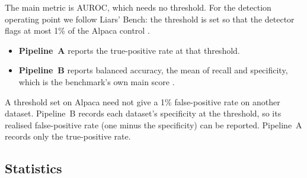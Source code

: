 The main metric is AUROC, which needs no threshold. For the detection operating point we follow Liars' Bench: the threshold is set so that the detector flags at most 1\% of the Alpaca control \parencite[p.~7]{kretschmar2025liars}.
\begin{itemize}
\item \textbf{Pipeline~A} reports the true-positive rate at that threshold. %
\item \textbf{Pipeline~B} reports balanced accuracy, the mean of recall and specificity, which is the benchmark's own main score \parencite[p.~7]{kretschmar2025liars}. %
\end{itemize}
A threshold set on Alpaca need not give a 1\% false-positive rate on another dataset. Pipeline~B records each dataset's specificity at the threshold, so its realised false-positive rate (one minus the specificity) can be reported. Pipeline~A records only the true-positive rate. %


\subsection{Statistics}
\label{sec:m-stats}

